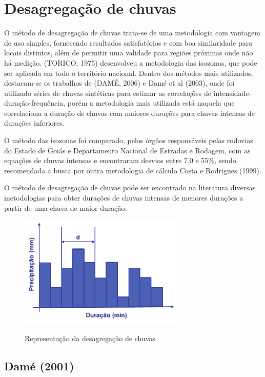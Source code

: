 \section{Desagregação de chuvas}

O método de desagregação de chuvas trata-se de uma metodologia com vantagem de uso simples, fornecendo resultados satisfatórios e com boa similaridade para locais distintos, além de permitir uma validade para regiões próximas onde não há medição. (TORICO, 1975) desenvolveu a metodologia das isozonas, que pode ser aplicada em todo o território nacional. Dentro dos métodos mais utilizados, destacam-se os trabalhos de (DAMÉ, 2006) e Damé et al (2003), onde foi utilizado séries de chuvas sintéticas para estimar as correlações de intensidade-duração-frequência, porém a metodologia mais utilizada está naquela que correlaciona a duração de chuvas com maiores durações para chuvas intensas de durações inferiores.

O método das isozonas foi comparado, pelos órgãos responsáveis pelas rodovias do Estado de Goiás e Departamento Nacional de Estradas e Rodagem, com as equações de chuvas intensas e encontraram desvios entre 7,0 e 55\%, sendo recomendada a busca por outra metodologia de cálculo Costa e Rodrigues (1999).

O método de desagregação de chuvas pode ser encontrado na literatura diversas metodologias para obter durações de chuvas intensas de menores durações a partir de uma chuva de maior duração.

\begin{figure}
    \caption{Representação da desagregação de chuvas}
    \centering
    \includegraphics[width=0.7\textwidth]{Textuais/Figuras/desagregacao.pdf}
    \label{fig:desagregacao}
\end{figure}

\subsection{Damé (2001)}

